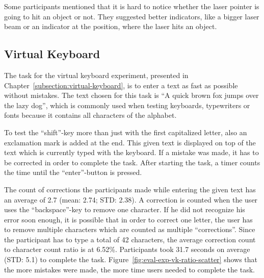 Some participants mentioned that it is hard to notice whether the laser pointer is going to hit an object or not. They suggested better indicators, like a bigger laser beam or an indicator at the position, where the laser hits an object.


\subsection{Virtual Keyboard}\label{section:eval-res-vk}

The task for the virtual keyboard experiment, presented in Chapter~\ref{subsection:virtual-keyboard}, is to enter a text as fast as possible without mistakes. The text chosen for this task is \enquote{A quick brown fox jumps over the lazy dog}, which is commonly used when testing keyboards, typewriters or fonts because it contains all characters of the alphabet.

To test the \enquote{shift}-key more than just with the first capitalized letter, also an exclamation mark is added at the end. This given text is displayed on top of the text which is currently typed with the keyboard. If a mistake was made, it has to be corrected in order to complete the task. After starting the task, a timer counts the time until the \enquote{enter}-button is pressed.

The count of corrections the participants made while entering the given text has an average of 2.7 (mean: 2.74; \gls{STD}: 2.38). A correction is counted when the user uses the \enquote{backspace}-key to remove one character. If he did not recognize his error soon enough, it is possible that in order to correct one letter, the user has to remove multiple characters which are counted as multiple \enquote{corrections}. Since the participant has to type a total of 42 characters, the average correction count to character count ratio is at 6.52\%.
Participants took 31.7 seconds on average (\gls{STD}: 5.1) to complete the task. Figure~\ref{fig:eval-exp-vk-ratio-scatter} shows that the more mistakes were made, the more time users needed to complete the task.

